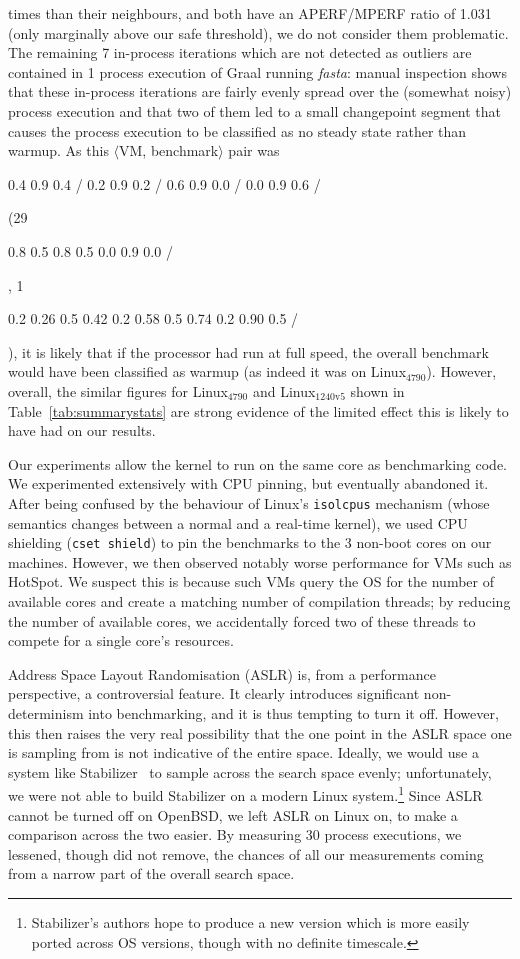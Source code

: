 \documentclass[acmsmall]{acmart}\settopmatter{printfolios=true}
\newcommand{\fasta}{\emph{fasta}\xspace}
\newcommand{\bencherfive}{Linux$_\mathrm{4790}$\xspace}
\newcommand{\bencherseven}{Linux$_\mathrm{1240v5}$\xspace}
\newcommand{\vmbpair}{$\langle$VM, benchmark$\rangle$\xspace}
\newcommand{\numpexecs}{30\xspace}
\DeclareRobustCommand{\nosteadystate}{%
\setlength{\sparklinethickness}{0.4pt}%
\begin{sparkline}{1.5}
\spark 0.1 0.2
       0.26 0.5
       0.42 0.2
       0.58 0.5
       0.74 0.2
       0.90 0.5
       /%
\end{sparkline}\xspace%
}
\DeclareRobustCommand{\warmup}{%
\setlength{\sparklinethickness}{0.4pt}%
\begin{sparkline}{1.5}
\spark 0.1 0.8
       0.5 0.8
       0.5 0.0
       0.9 0.0
       /%
\end{sparkline}\xspace%
}
\DeclareRobustCommand{\badinconsistent}{%
\setlength{\sparklinethickness}{0.4pt}%
\begin{sparkline}{1.5}
\spark 0.1 0.4
       0.9 0.4
       /%
\spark 0.1 0.2
       0.9 0.2
       /%
\spark 0.1 0.6
       0.9 0.0
       /%
\spark 0.1 0.0
       0.9 0.6
       /%
\end{sparkline}\xspace%
}
\begin{document}
times than their neighbours, and both have an APERF/MPERF ratio of 1.031
(only marginally above our safe threshold), we do not consider them problematic.
The remaining 7 in-process iterations which are not
detected as outliers are contained in 1 process execution of Graal running
\fasta: manual inspection shows that these in-process iterations are fairly
evenly spread over the (somewhat noisy) process execution and that two of them led
to a small changepoint segment that causes the process execution to be
classified as no steady state rather than warmup. As this \vmbpair pair was
\badinconsistent(29\warmup, 1\nosteadystate), it is likely that if
the processor had run at full speed, the overall benchmark
would have been classified as warmup (as indeed it was
on \bencherfive). However, overall, the similar figures
for \bencherfive and \bencherseven shown in Table~\ref{tab:summarystats} are
strong evidence of the limited effect this is likely to have had on our results.

Our experiments allow the kernel to run on the same core as benchmarking code.
We experimented extensively with CPU pinning, but eventually abandoned it. After
being confused by the behaviour of Linux's \texttt{isolcpus} mechanism (whose
semantics changes between a normal and a real-time kernel), we used CPU shielding
(\texttt{cset shield}) to pin the benchmarks to the 3 non-boot cores on our
machines. However, we then observed notably worse performance for VMs such as
HotSpot. We suspect this is because such VMs query the OS for the number of
available cores and create a matching number of compilation threads; by reducing
the number of available cores, we accidentally forced two of these threads to
compete for a single core's resources.

Address Space Layout Randomisation (ASLR) is, from a performance perspective, a
controversial feature. It clearly introduces significant non-determinism into
benchmarking, and it is thus tempting to turn it off. However, this then raises
the very real possibility that the one point in the ASLR space one is sampling
from is not indicative of the entire space. Ideally, we would use a system like
Stabilizer~\cite{curtsinger13stabilizer} to
sample across the search space evenly; unfortunately, we were not able to build
Stabilizer on a modern Linux system.\footnote{Stabilizer's authors hope to
produce a new version which is more easily ported across OS versions, though
with no definite timescale.} Since ASLR cannot be turned off on OpenBSD,
we left ASLR on Linux on, to make a comparison across the two easier.
By measuring \numpexecs process executions, we lessened, though did not
remove, the chances of all our measurements coming from a narrow part of the
overall search space.
\end{document}
